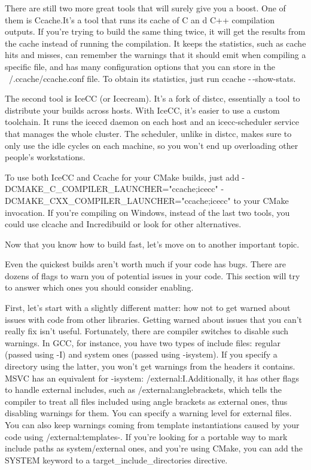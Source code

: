 There are still two more great tools that will surely give you a boost. One of them is Ccache.It's a tool that runs its cache of C an d C++ compilation outputs. If you're trying to build the same thing twice, it will get the results from the cache instead of running the compilation. It keeps the statistics, such as cache hits and misses, can remember the warnings that it should emit when compiling a specific file, and has many configuration options that you can store in the ~/.ccache/ccache.conf file. To obtain its statistics, just run ccache -\,-show-stats.

The second tool is IceCC (or Icecream). It's a fork of distcc, essentially a tool to distribute your builds across hosts. With IceCC, it's easier to use a custom toolchain. It runs the iceccd daemon on each host and an icecc-scheduler service that manages the whole cluster. The scheduler, unlike in distcc, makes sure to only use the idle cycles on each machine, so you won't end up overloading other people's workstations.

To use both IceCC and Ccache for your CMake builds, just add -DCMAKE\_C\_COMPILER\_LAUNCHER="ccache;icecc" -DCMAKE\_CXX\_COMPILER\_LAUNCHER="ccache;icecc" to your CMake invocation. If you're compiling on Windows, instead of the last two tools, you could use clcache and Incredibuild or look for other alternatives.

Now that you know how to build fast, let's move on to another important topic.


Even the quickest builds aren't worth much if your code has bugs. There are dozens of flags to warn you of potential issues in your code. This section will try to answer which ones you should consider enabling.

First, let's start with a slightly different matter: how not to get warned about issues with code from other libraries. Getting warned about issues that you can't really fix isn't useful. Fortunately, there are compiler switches to disable such warnings. In GCC, for instance, you have two types of include files: regular (passed using -I) and system ones (passed using -isystem). If you specify a directory using the latter, you won't get warnings from the headers it contains. MSVC has an equivalent for -isystem: /external:I.Additionally, it has other flags to handle external includes, such as /external:anglebrackets, which tells the compiler to treat all files included using angle brackets as external ones, thus disabling warnings for them. You can specify a warning level for external files. You can also keep warnings coming from template instantiations caused by your code using /external:templates-. If you're looking for a portable way to mark include paths as system/external ones, and you're using CMake, you can add the SYSTEM keyword to a target\_include\_directories directive.


